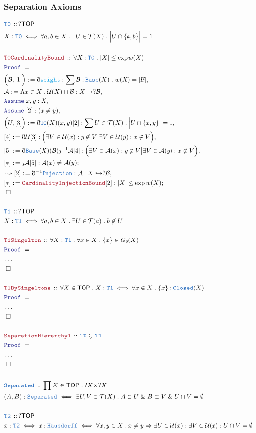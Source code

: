 \documentclass[12pt]{scrartcl}
\newcommand{\TYPE}[1]{\textcolor{NavyBlue}{\mathtt{#1}}}
\newcommand{\FUNC}[1]{\textcolor{Cerulean}{\mathtt{#1}}}
\newcommand{\LOGIC}[1]{\textcolor{Blue}{\mathtt{#1}}}
\newcommand{\THM}[1]{\textcolor{Maroon}{\mathtt{#1}}}
\renewcommand{\.}{\; . \;}
\newcommand{\de}{: \kern 0.1pc =}
\newcommand{\Theorem}[2]{& \THM{#1} \, :: \, #2 \\ & \Proof = \\ }
\newcommand{\DeclareType}[2]{& \TYPE{#1} \, :: \, #2 \\}
\newcommand{\DefineType}[3]{& #1 : \TYPE{#2} \iff #3 \\}
\newcommand{\DefineNamedType}[4]{& #1 : \TYPE{#2} \iff #3 \iff #4 \\}
\newcommand{\Page}[1]{ \begin{align*} #1 \end{align*}   }
\newcommand{ \bd }{ \ByDef }
\newcommand{\NoProof}{ & \ldots \\ \EndProof}
\renewcommand{\And}{\; \& \;}
\newcommand{\Imply}{\Rightarrow}
\newcommand{\ToInj}{\hookrightarrow}
\newcommand{\Say}[3]{& #1 \de #2 : #3, \\}
\newcommand{\Conclude}[3]{& #1 \de #2 : #3; \\}
\newcommand{\Derive}[3]{& \leadsto #1 \de #2 : #3, \\}
\newcommand{\Assume}[2]{& \LOGIC{Assume} \; #1 : #2, \\}
\newcommand{\QED}{\; \square}
\newcommand{\EndProof}{& \QED \\}
\newcommand{\ByDef}{\eth}
\newcommand{\ByConstr}{\jmath}
\newcommand{\Proof}{\LOGIC{Proof} \; }
\newcommand{\A}{\mathcal{A}}
\newcommand{\B}{\mathcal{B}}
\newcommand{\TOP}{\mathsf{TOP}}
\newcommand{\T}{\mathcal{T}}
\newcommand{\U}{\mathcal{U}}
\begin{document}
\subsubsection{Separation Axioms}
\Page{
	\DeclareType{T0}{?\TOP}
	\DefineType{X}{T0}
	{
		\forall a,b \in X \. \exists U \in \T(X) \.
		\Big|U \cap \{a, b \}\Big| = 1 
	}
	\\
	\Theorem{T0CardinalityBound}
	{
		\forall X : \TYPE{T0} \.
		|X| \le \exp w(X)
	}
	\Say{\Big(\B,[1]\Big)}
	{
		\bd \FUNC{weight}
	}
	{
		\sum \B : \TYPE{Base}(X) \. w(X) = |\B|
	}
	\Say{\A}{\Lambda x \in X \. \U(X) \cap \B}
	{
		X \to ?\B
	}
	\Assume{x,y}{X}
	\Assume{[2]}{(x \neq y)}
	\Say{\Big(U,[3]\Big)}
	{
		\bd \TYPE{T0}(X)(x,y)[2]
	}
	{
		\sum U \in \T(X) \. \Big|U \cap \{x,y\}\Big| =  1
	}
	\Say{[4]}{\bd \U [3]}
	{
		\Big( \exists V  \in \U(x) : y \not \in V \big|
		\exists V  \in \U(y) : x \not \in V \Big)
	}
	\Say{[5]}{\bd \TYPE{Base}(X)(\B) \ByConstr^{-1} \A [4]}
	{
		\Big( \exists V  \in \A(x) : y \not \in V \big|
		\exists V  \in \A(y) : x \not \in V \Big)
	}
	\Conclude{[*]}{\ByConstr \A [5]}
	{
		\A(x) \neq \A(y)
	}
	\Derive{[2]}{\bd^{-1} \TYPE{Injection}}
	{
		\A : X \ToInj ?\B
	}
	\Conclude{[*]}{\THM{CardinalityInjectionBound}[2]}
	{ 
	  |X| \le  \exp w(X)
	}
	\EndProof
	\\
	\DeclareType{T1}{?\TOP}
	\DefineType{X}{T1}
	{
		\forall a,b \in X \.  \exists U \in \T(a) \.
		b \not \in U 
	}
	\\
	\Theorem{T1Singelton}
	{
		\forall X : \TYPE{T1} \. \forall x \in X \. 
		\{ x \} \in G_\delta(X)
	}
	\NoProof
	\\
	\Theorem{T1BySingeltons}
	{
		\forall X \in \TOP \.
		X : \TYPE{T1} \iff
		\forall x \in X \.
		\{x\} : \TYPE{Closed}(X)
	}
	\NoProof
	\\
	\Theorem{SeparationHierarchy1}
	{
		\TYPE{T0} \subsetneq \TYPE{T1}
	}
	\NoProof
	\\
	\DeclareType{Separated}
	{
		\prod X \in \TOP \.
		?X \times ?X
	}
	\DefineType{(A,B)}{Separated}
	{
		\exists U,V \in \T(X) \. A \subset U \And B \subset V \And U \cap V = \emptyset
	}
	\\
	\DeclareType{T2}{?\TOP}
	\DefineNamedType{x}{T2}{x : \TYPE{Hausdorff}}
	{
		\forall x,y \in X \.
		x \neq y \Imply 
		\exists U \in \U(x) : 
		\exists V \in \U(x) :
		U \cap V = \emptyset
	}
}
\end{document}
